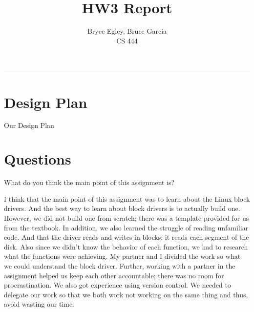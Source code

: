\documentclass{article}
\newenvironment{question}[2][Question]{\begin{trivlist}
\item[\hskip \labelsep {\bfseries #1}\hskip \labelsep {\bfseries #2.}]}{\end{trivlist}}
\begin{document}

\title{HW3 Report} %
\author{Bryce Egley, Bruce Garcia\\CS 444} %

\maketitle
\hrule


%
%

\section*{Design Plan}
Our Design Plan
\newline


\section*{Questions}

\begin{question}{1}
What do you think the main point of this assignment is?
\end{question}
I think that the main point of this assignment was to learn about the Linux block drivers. And the best way to learn about block drivers is to actually build one. However, we did not build one from scratch; there was a template provided for us from the textbook. In addition, we also learned the struggle of reading unfamiliar code. And that the driver reads and writes in blocks; it reads each segment of the disk. Also since we didn't know the behavior of each function, we had to research what the functions were achieving. My partner and I divided the work so what we could understand the block driver. Further, working with a partner in the assignment helped us keep each other accountable; there was no room for procrastination. We also got experience using version control. We needed to delegate our work so that we both work not working on the same thing and thus, avoid wasting our time. 
\end{document}
